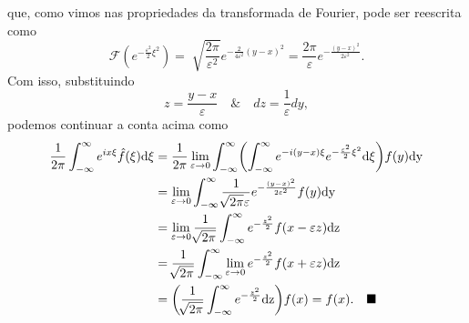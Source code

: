 \documentclass[../pde_notes.tex]{subfiles}
\begin{document}
\begin{proof*}
\[	\]
	que, como vimos nas propriedades da transformada de Fourier, pode ser reescrita como
	\[
		\mathcal{F}(e^{-\frac{\varepsilon^{2}}{2}\xi ^{2}}) = \sqrt[]{\frac{2\pi }{\varepsilon^{2}}}e^{-\frac{2}{4\varepsilon^{2}}(y-x)^{2}} = \frac{2\pi }{\varepsilon }e^{-\frac{(y-x)^{2}}{2\varepsilon^{2}}}.
	\]
	Com isso, substituindo
	\[
		z = \frac{y-x}{\varepsilon } \quad\&\quad dz = \frac{1}{\varepsilon }dy,
	\]
	podemos continuar a conta acima como
	\begin{align*}
		\frac{1}{2\pi }\int_{-\infty}^{\infty}e^{ix\xi }\hat{f}(\xi ) \mathrm{d\xi } & = \frac{1}{2\pi }\lim_{\varepsilon \to 0}\int_{-\infty}^{\infty}\biggl(\int_{-\infty}^{\infty}e^{-i(y-x)\xi }e^{-\frac{\varepsilon^{2} }{2}\xi^{2}} \mathrm{d\xi }\biggr)f(y) \mathrm{dy} \\
		                                                                             & = \lim_{\varepsilon \to 0}\int_{-\infty}^{\infty}\frac{1}{\sqrt[]{2\pi }\varepsilon }e^{-\frac{(y-x)^{2}}{2\varepsilon^{2}}}f(y) \mathrm{dy}                                              \\
		                                                                             & = \lim_{\varepsilon \to 0}\frac{1}{\sqrt[]{2\pi }}\int_{-\infty}^{\infty}e^{-\frac{z^{2}}{2}}f(x-\varepsilon z) \mathrm{dz}                                                               \\
		                                                                             & = \frac{1}{\sqrt[]{2\pi }}\int_{-\infty}^{\infty}\lim_{\varepsilon \to 0}e^{-\frac{z^{2}}{2}}f(x+\varepsilon z) \mathrm{dz}                                                               \\
		                                                                             & = \biggl(\frac{1}{\sqrt[]{2\pi }}\int_{-\infty}^{\infty}e^{-\frac{z^{2}}{2}} \mathrm{dz}\biggr)f(x) = f(x). \quad \text{$\blacksquare$}
	\end{align*}
\end{proof*}
\end{document}
